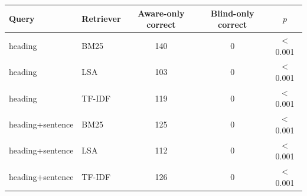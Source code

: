 \begin{tabular}{llccc}
\toprule
Query & Retriever & Aware-only correct & Blind-only correct & $p$ \\
\midrule
heading & BM25 & 140 & 0 & $<$0.001 \\
heading & LSA & 103 & 0 & $<$0.001 \\
heading & TF-IDF & 119 & 0 & $<$0.001 \\
heading+sentence & BM25 & 125 & 0 & $<$0.001 \\
heading+sentence & LSA & 112 & 0 & $<$0.001 \\
heading+sentence & TF-IDF & 126 & 0 & $<$0.001 \\
\bottomrule
\end{tabular}
